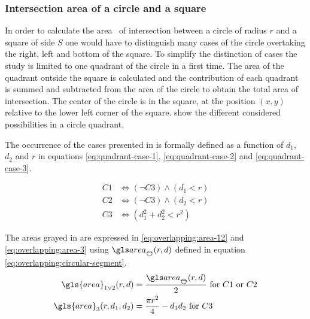 \begin{appendix}
\subsubsection{Intersection area of a circle and a square}\label{sec:circle-square-intersection}


\bigskip

In order to calculate the area \cirsqr \ of intersection between a circle of radius \( r \) and a square of side \( S \) one would have to distinguish many cases of the circle overtaking the right, left and bottom of the square.
To simplify the distinction of cases the study is limited to one quadrant of the circle in a first time.
The area of the quadrant outside the square is calculated and the contribution of each quadrant is summed and subtracted from the area of the circle to obtain the total area of intersection.
The center of the circle is in the square, at the position \( (x, y ) \) relative to the lower left corner of the square.
 show the different considered possibilities in a circle quadrant.

\bigskip


\bigskip

The occurrence of the cases presented in  is formally defined as a function of \( d_1 \), \( d_2 \) and \( r \) in equations \eqref{eq:quadrant-case-1}, \eqref{eq:quadrant-case-2} and \eqref{eq:quadrant-case-3}.

\begin{align}
C1 &\Longleftrightarrow \left( \neg C3 \right) \wedge \left( d_1 < r \right) \label{eq:quadrant-case-1} \\
C2 &\Longleftrightarrow \left( \neg C3 \right) \wedge \left( d_2 < r \right) \label{eq:quadrant-case-2} \\
C3 &\Longleftrightarrow \left( d_1^2 + d_2^2 < r^2 \right) \label{eq:quadrant-case-3}
\end{align}

\medskip

The areas grayed in  are expressed in \eqref{eq:overlapping:area-12} and \eqref{eq:overlapping:area-3} using \( \cirseg(r, d) \) defined in equation \eqref{eq:overlapping:circular-segment}.
\begin{align}
\gls{area}_{1 \lor 2} (r, d) &= \frac{\cirseg(r, d)}{2} \label{eq:overlapping:area-12} \ \text{for } C1 \text{ or } C2 \\
\gls{area}_3 (r, d_1, d_2) &= \frac{\pi r^2}{4} - d_1 d_2 \label{eq:overlapping:area-3} \ \text{for } C3
\end{align}


\end{appendix}
